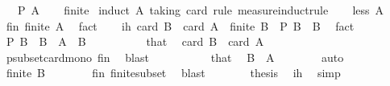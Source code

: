\begin{isabellebody}
\ \ \ {\isachardoublequoteopen}P\ A{\isachardoublequoteclose}\isanewline
%
\isadelimproof
\ \ %
\endisadelimproof
%
\isatagproof
{}\isamarkupfalse%
\ finite\isanewline
{}\isamarkupfalse%
\ {\isacharparenleft}{\kern0pt}induct\ A\ taking{\isacharcolon}{\kern0pt}\ card\ rule{\isacharcolon}{\kern0pt}\ measure{\isacharunderscore}{\kern0pt}induct{\isacharunderscore}{\kern0pt}rule{\isacharparenright}{\kern0pt}\isanewline
\ \ \isamarkupfalse%
\ {\isacharparenleft}{\kern0pt}less\ A{\isacharparenright}{\kern0pt}\isanewline
\ \ \isamarkupfalse%
\ fin{\isacharcolon}{\kern0pt}\ {\isachardoublequoteopen}finite\ A{\isachardoublequoteclose}\ \isamarkupfalse%
\ fact\isanewline
\ \ \isamarkupfalse%
\ ih{\isacharcolon}{\kern0pt}\ {\isachardoublequoteopen}card\ B\ {\isacharless}{\kern0pt}\ card\ A\ {\isasymLongrightarrow}\ finite\ B\ {\isasymLongrightarrow}\ P\ B{\isachardoublequoteclose}\ \ B\ \isamarkupfalse%
\ fact\isanewline
\ \ \isamarkupfalse%
\ {\isachardoublequoteopen}P\ B{\isachardoublequoteclose}\ \ {\isachardoublequoteopen}B\ {\isasymsubset}\ A{\isachardoublequoteclose}\ \ B\isanewline
\ \ \isamarkupfalse%
\ {\isacharminus}{\kern0pt}\isanewline
\ \ \ \ \isamarkupfalse%
\ that\ \isamarkupfalse%
\ {\isachardoublequoteopen}card\ B\ {\isacharless}{\kern0pt}\ card\ A{\isachardoublequoteclose}\isanewline
\ \ \ \ \ \ \isamarkupfalse%
\ psubset{\isacharunderscore}{\kern0pt}card{\isacharunderscore}{\kern0pt}mono\ fin\ \isamarkupfalse%
\ blast\isanewline
\ \ \ \ \isamarkupfalse%
\isanewline
\ \ \ \ \isamarkupfalse%
\ that\ \isamarkupfalse%
\ {\isachardoublequoteopen}B\ {\isasymsubseteq}\ A{\isachardoublequoteclose}\isanewline
\ \ \ \ \ \ \isamarkupfalse%
\ auto\isanewline
\ \ \ \ \isamarkupfalse%
\ \isamarkupfalse%
\ {\isachardoublequoteopen}finite\ B{\isachardoublequoteclose}\isanewline
\ \ \ \ \ \ \isamarkupfalse%
\ fin\ finite{\isacharunderscore}{\kern0pt}subset\ \isamarkupfalse%
\ blast\isanewline
\ \ \ \ \isamarkupfalse%
\ \isamarkupfalse%
\ {\isacharquery}{\kern0pt}thesis\ \isamarkupfalse%
\ ih\ \isamarkupfalse%
\ simp\isanewline
\ \ \isamarkupfalse%
\isanewline
\ \ \isamarkupfalse%

\end{isabellebody}
